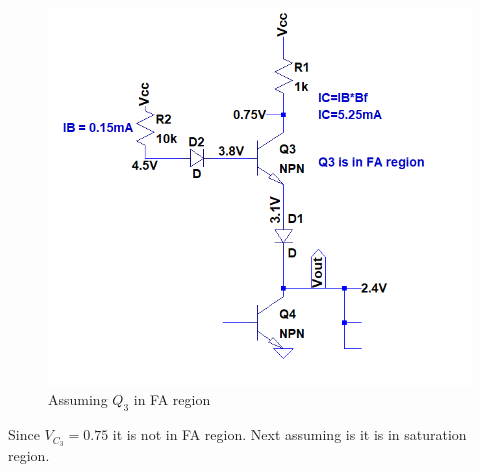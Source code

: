 \documentclass[11 pt]{article}
\begin{document}
\begin{figure}[H]
  \includegraphics[width=\linewidth]{bb}
  \caption{Assuming $Q_3$ in FA region}
  \label{fig:zero}
\end{figure}

Since $V_{C_3}=0.75$ it is not in FA region. Next assuming is it is in saturation region.
\end{document}
